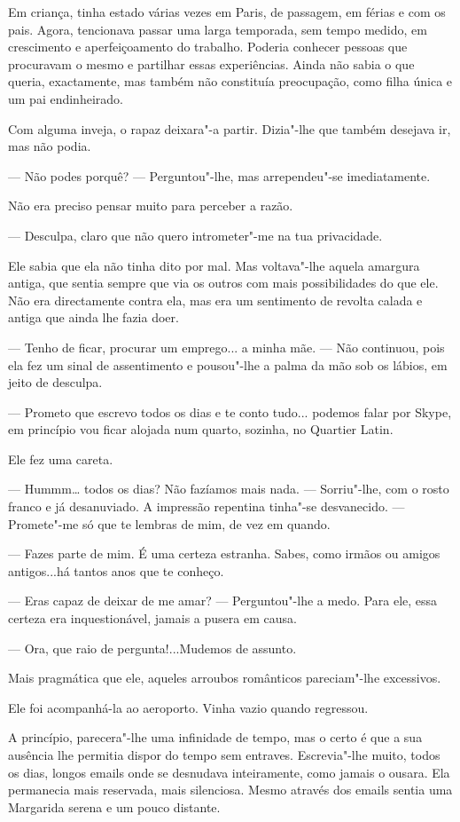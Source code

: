 Em criança, tinha estado várias vezes em Paris, de passagem, em férias e
com os pais. Agora, tencionava passar uma larga temporada, sem tempo
medido, em crescimento e aperfeiçoamento do trabalho. Poderia conhecer
pessoas que procuravam o mesmo e partilhar essas experiências. Ainda não
sabia o que queria, exactamente, mas também não constituía preocupação,
como filha única e um pai endinheirado.

Com alguma inveja, o rapaz deixara"-a partir. Dizia"-lhe que também
desejava ir, mas não podia.

--- Não podes porquê? --- Perguntou"-lhe, mas arrependeu"-se imediatamente.

Não era preciso pensar muito para perceber a razão.

--- Desculpa, claro que não quero intrometer"-me na tua privacidade.

Ele sabia que ela não tinha dito por mal. Mas voltava"-lhe aquela
amargura antiga, que sentia sempre que via os outros com mais
possibilidades do que ele. Não era directamente contra ela, mas era um
sentimento de revolta calada e antiga que ainda lhe fazia doer.

--- Tenho de ficar, procurar um emprego... a minha mãe. --- Não continuou,
pois ela fez um sinal de assentimento e pousou"-lhe a palma da mão sob os
lábios, em jeito de desculpa.

--- Prometo que escrevo todos os dias e te conto tudo... podemos falar por
Skype, em princípio vou ficar alojada num quarto, sozinha, no Quartier
Latin.

Ele fez uma careta.

--- Hummm\ldots{} todos os dias? Não fazíamos mais nada. --- Sorriu"-lhe, com
o rosto franco e já desanuviado. A impressão repentina tinha"-se
desvanecido. --- Promete"-me só que te lembras de mim, de vez em quando.

--- Fazes parte de mim. É uma certeza estranha. Sabes, como irmãos ou
amigos antigos...há tantos anos que te conheço.

--- Eras capaz de deixar de me amar? --- Perguntou"-lhe a medo. Para ele,
essa certeza era inquestionável, jamais a pusera em causa.

--- Ora, que raio de pergunta!...Mudemos de assunto.

Mais pragmática que ele, aqueles arroubos românticos pareciam"-lhe
excessivos.

Ele foi acompanhá-la ao aeroporto. Vinha vazio quando regressou.

A princípio, parecera"-lhe uma infinidade de tempo, mas o certo é que a
sua ausência lhe permitia dispor do tempo sem entraves. Escrevia"-lhe
muito, todos os dias, longos emails onde se desnudava inteiramente, como
jamais o ousara. Ela permanecia mais reservada, mais silenciosa. Mesmo
através dos emails sentia uma Margarida serena e um pouco distante.

